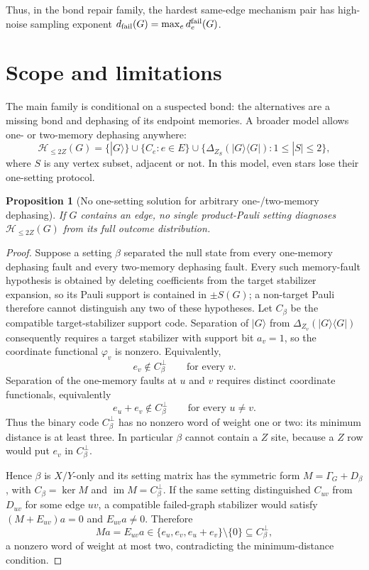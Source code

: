 \documentclass[11pt]{article}
\newtheorem{proposition}[theorem]{Proposition}
\theoremstyle{remark}
\begin{document}
Thus, in the bond repair family, the hardest same-edge mechanism pair has high-noise sampling exponent $d_{\rm fail}(G)=\max_e d_e^{\rm fail}(G)$. 

\section{Scope and limitations}\label{sec:discussion}
The main family is conditional on a suspected bond: the alternatives are a missing bond and dephasing of its endpoint memories.  A broader model allows one- or two-memory dephasing anywhere:
\[
\mathcal H_{\le2Z}(G)=\{|G\rangle\}\cup\{C_e:e\in E\}\cup
\{\Delta_{Z_S}(|G\rangle\langle G|):1\le |S|\le2\},
\]
where $S$ is any vertex subset, adjacent or not.  In this model, even stars lose their one-setting protocol.

\begin{proposition}[No one-setting solution for arbitrary one-/two-memory dephasing]\label{prop:nooneset}
If $G$ contains an edge, no single product-Pauli setting diagnoses $\mathcal H_{\le2Z}(G)$ from its full outcome distribution.
\end{proposition}
\begin{proof}
Suppose a setting $\beta$ separated the null state from every one-memory dephasing fault and every two-memory dephasing fault. Every such memory-fault hypothesis is obtained by deleting coefficients from the target stabilizer expansion, so its Pauli support is contained in $\pm S(G)$; a non-target Pauli therefore cannot distinguish any two of these hypotheses. Let $C_\beta$ be the compatible target-stabilizer support code. Separation of $|G\rangle$ from $\Delta_{Z_v}(|G\rangle\langle G|)$ consequently requires a target stabilizer with support bit $a_v=1$, so the coordinate functional $\varphi_v$ is nonzero. Equivalently,
\[
 e_v\notin C_\beta^\perp\qquad\text{for every }v.
\]
Separation of the one-memory faults at $u$ and $v$ requires distinct coordinate functionals, equivalently
\[
 e_u+e_v\notin C_\beta^\perp\qquad\text{for every }u\ne v.
\]
Thus the binary code $C_\beta^\perp$ has no nonzero word of weight one or two: its minimum distance is at least three. In particular $\beta$ cannot contain a $Z$ site, because a $Z$ row would put $e_v$ in $C_\beta^\perp$.

Hence $\beta$ is $X/Y$-only and its setting matrix has the symmetric form $M=\Gamma_G+D_\beta$, with $C_\beta=\ker M$ and $\operatorname{im}M=C_\beta^\perp$. If the same setting distinguished $C_{uv}$ from $D_{uv}$ for some edge $uv$, a compatible failed-graph stabilizer would satisfy $(M+E_{uv})a=0$ and $E_{uv}a\ne0$. Therefore
\[
 Ma=E_{uv}a\in\{e_u,e_v,e_u+e_v\}\setminus\{0\}\subseteq C_\beta^\perp,
\]
a nonzero word of weight at most two, contradicting the minimum-distance condition.
\end{proof}
\end{document}

